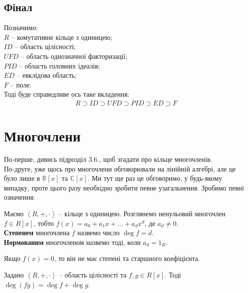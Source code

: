 \documentclass{math_library}
\begin{document}
\subsection*{Фінал}
Позначимо: \\
$R$ -- комутативне кільце з одиницею; \\
$ID$ -- область цілісності; \\
$UFD$ -- область однозначної факторизації; \\
$PID$ -- область головних ідеалів; \\
$ED$ -- евклідова область; \\
$F$ -- поле.\\
Тоді буде справедливе ось таке вкладення:
\begin{align*}
R \supset ID \supset UFD \supset PID \supset ED \supset F
\end{align*}

\newpage

\fi

\iffalse
\section{Многочлени}
По-перше, дивись підрозділ 3.6., щоб згадати про кільце многочленів.\\
По-друге, уже щось про многочлени обговорювали на лінійній алгебрі, але це було лише в $\mathbb{R}[x]$ та $\mathbb{C}[x]$. Ми тут ще раз це обговоримо, у будь-якому випадку, проте цього разу необхідно зробити певне узагальнення. Зробимо певні означення:

\begin{definition}
Маємо $\left< R,+,\cdot\right>$ -- кільце з одиницею. Розглянемо ненульовий многочлен $f \in R[x]$, тобто $f(x) = a_0 + a_1 x + \dots + a_d x^d$, де $a_d \neq 0$.\\
\textbf{Степенем} многочлена $f$ назвемо число $\deg f = d$.\\
\textbf{Нормованим} многочленом назвемо тоді, коли $a_d = 1_R$.
\end{definition}

\begin{remark}
Якщо $f(x) = 0$, то він не має степені та старшного коефіцієнта.
\end{remark}

\begin{proposition}
Задано $\left<R,+,\cdot\right>$ -- область цілісності та $f,g \in R[x]$. Тоді $\deg (fg) = \deg f + \deg g$.
\end{proposition}
\end{document}
